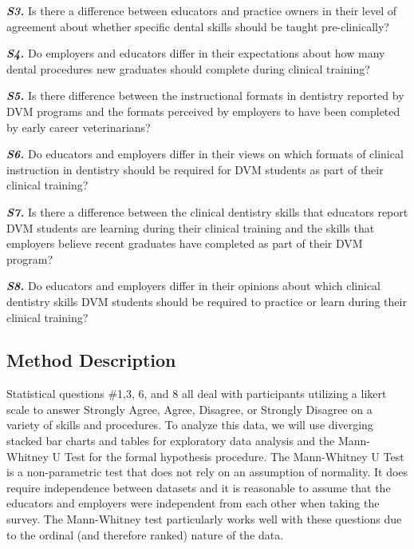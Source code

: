 \documentclass[
  11pt,
  letterpaper,
  DIV=11,
  numbers=noendperiod]{scrartcl}
\begin{document}
\textbf{\emph{S3.}} Is there a difference between educators and practice
owners in their level of agreement about whether specific dental skills
should be taught pre-clinically?

\textbf{\emph{S4.}} Do employers and educators differ in their
expectations about how many dental procedures new graduates should
complete during clinical training?

\textbf{\emph{S5.}} Is there difference between the instructional
formats in dentistry reported by DVM programs and the formats perceived
by employers to have been completed by early career veterinarians?

\textbf{\emph{S6.}} Do educators and employers differ in their views on
which formats of clinical instruction in dentistry should be required
for DVM students as part of their clinical training?

\textbf{\emph{S7.}} Is there a difference between the clinical dentistry
skills that educators report DVM students are learning during their
clinical training and the skills that employers believe recent graduates
have completed as part of their DVM program?

\textbf{\emph{S8.}} Do educators and employers differ in their opinions
about which clinical dentistry skills DVM students should be required to
practice or learn during their clinical training?

\subsection{Method Description}\label{method-description}

Statistical questions \#1,3, 6, and 8 all deal with participants
utilizing a likert scale to answer Strongly Agree, Agree, Disagree, or
Strongly Disagree on a variety of skills and procedures. To analyze this
data, we will use diverging stacked bar charts and tables for
exploratory data analysis and the Mann-Whitney U Test for the formal
hypothesis procedure. The Mann-Whitney U Test is a non-parametric test
that does not rely on an assumption of normality. It does require
independence between datasets and it is reasonable to assume that the
educators and employers were independent from each other when taking the
survey. The Mann-Whitney test particularly works well with these
questions due to the ordinal (and therefore ranked) nature of the data.
\end{document}
